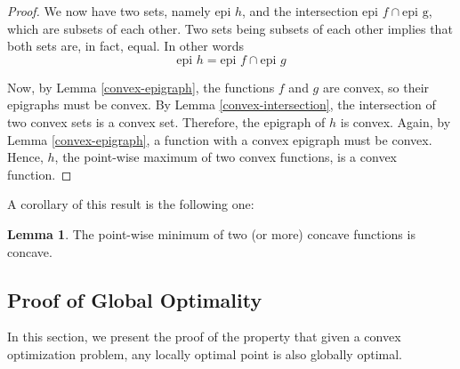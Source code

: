 \documentclass[a4paper]{article}
\theoremstyle{definition}
\newtheorem{lemma}{Lemma}[subsection]
\begin{document}
\begin{proof}
	We now have two sets, namely $\text{epi } h$, and the intersection $\text{epi } f \cap \text{epi g}$, which are subsets of each other.
	Two sets being subsets of each other implies that both sets are, in fact, equal.
	In other words
	\begin{equation*}
		\text{epi } h = \text{epi } f \cap \text{epi } g
	\end{equation*}

	Now, by Lemma \ref{convex-epigraph}, the functions $f$ and $g$ are convex, so their epigraphs must be convex.
	By Lemma \ref{convex-intersection}, the intersection of two convex sets is a convex set.
	Therefore, the epigraph of $h$ is convex.
	Again, by Lemma \ref{convex-epigraph}, a function with a convex epigraph must be convex.
	Hence, $h$, the point-wise maximum of two convex functions, is a convex function.
\end{proof}

A corollary of this result is the following one:
\begin{lemma}
	\label{concave-point-wise-min}
	The point-wise minimum of two (or more) concave functions is concave.
\end{lemma}

\subsection{Proof of Global Optimality}
\label{proof-global-property}

In this section, we present the proof of the property that given a convex optimization problem, any locally optimal point is also globally optimal.
\end{document}
